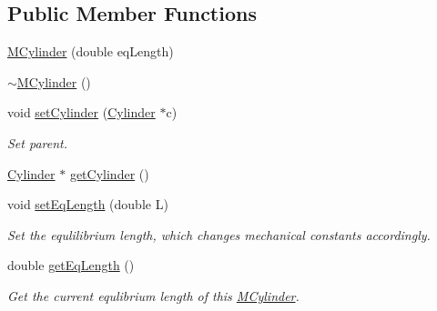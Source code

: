 \subsection*{Public Member Functions}
\begin{DoxyCompactItemize}
\item 
\hyperlink{classMCylinder_aebb2581fd3b7d43a0d5fa166e388691b}{M\+Cylinder} (double eq\+Length)
\item 
\hyperlink{classMCylinder_aeff5ed74bb8bffb0ac7e934f399851c6}{$\sim$\+M\+Cylinder} ()
\item 
void \hyperlink{classMCylinder_a83c3f990d2eab221b1007a04f3bf7d12}{set\+Cylinder} (\hyperlink{classCylinder}{Cylinder} $\ast$c)
\begin{DoxyCompactList}\small\item\em Set parent. \end{DoxyCompactList}\item 
\hyperlink{classCylinder}{Cylinder} $\ast$ \hyperlink{classMCylinder_aabfcc013b8cbc9af120936a0792c5167}{get\+Cylinder} ()
\item 
void \hyperlink{classMCylinder_a3f71512d5957c9a6682ddb424f05f038}{set\+Eq\+Length} (double L)
\begin{DoxyCompactList}\small\item\em Set the equlilibrium length, which changes mechanical constants accordingly. \end{DoxyCompactList}\item 
double \hyperlink{classMCylinder_a7c36dea92cebddaa04c01390debc18dd}{get\+Eq\+Length} ()
\begin{DoxyCompactList}\small\item\em Get the current equlibrium length of this \hyperlink{classMCylinder}{M\+Cylinder}. \end{DoxyCompactList}\end{DoxyCompactItemize}
{\bf }\par
